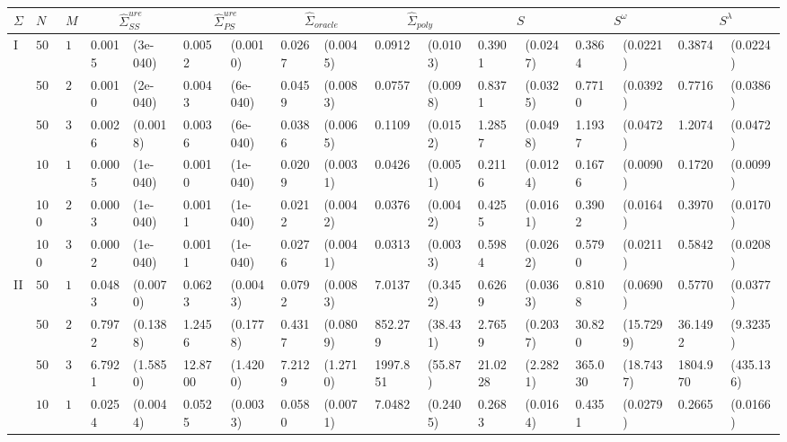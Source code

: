 \begin{landscape}
%
\begin{table}[H]
\centering
\begin{footnotesize}
\begin{tabular}{lllllllllllllllll}
$\Sigma$ & $N$ & $M$ & \multicolumn{2}{c}{$\hat{\Sigma}^{ure}_{SS}$} &  \multicolumn{2}{c}{$\hat{\Sigma}^{ure}_{PS}$} &  \multicolumn{2}{c}{$\hat{\Sigma}_{oracle}$}   &  \multicolumn{2}{c}{$\hat{\Sigma}_{poly}$}  &  \multicolumn{2}{c}{$S$}   &  \multicolumn{2}{c}{$S^\omega$}   &  \multicolumn{2}{c}{$S^\lambda$}   \\ 
  \hline
I & $50$ & $10$ & 0.0015 & (3e-040) & 0.0052 & (0.0010) & 0.0267 & (0.0045) & 0.0912 & (0.0103) & 0.3901 & (0.0247) & 0.3864 & (0.0221) & 0.3874 & (0.0224) \\ 
    &  50 & $20$ & 0.0010 & (2e-040) & 0.0043 & (6e-040) & 0.0459 & (0.0083) & 0.0757 & (0.0098) & 0.8371 & (0.0325) & 0.7710 & (0.0392) & 0.7716 & (0.0386) \\ 
    & 50  & $30$ & 0.0026 & (0.0018) & 0.0036 & (6e-040) & 0.0386 & (0.0065) & 0.1109 & (0.0152) & 1.2857 & (0.0498) & 1.1937 & (0.0472) & 1.2074 & (0.0472) \\ 
    & $100$ & $10$ & 0.0005 & (1e-040) & 0.0010 & (1e-040) & 0.0209 & (0.0031) & 0.0426 & (0.0051) & 0.2116 & (0.0124) & 0.1676 & (0.0090) & 0.1720 & (0.0099) \\ 
    &  100 & $20$ & 0.0003 & (1e-040) & 0.0011 & (1e-040) & 0.0212 & (0.0042) & 0.0376 & (0.0042) & 0.4255 & (0.0161) & 0.3902 & (0.0164) & 0.3970 & (0.0170) \\ 
    & 100  & $30$ & 0.0002 & (1e-040) & 0.0011 & (1e-040) & 0.0276 & (0.0041) & 0.0313 & (0.0033) & 0.5984 & (0.0262) & 0.5790 & (0.0211) & 0.5842 & (0.0208) \\ 
  II & $50$ & $10$ & 0.0483 & (0.0070) & 0.0623 & (0.0043) & 0.0792 & (0.0083) & 7.0137 & (0.3452) & 0.6269 & (0.0363) & 0.8108 & (0.0690) & 0.5770 & (0.0377) \\ 
    &50   & $20$ & 0.7972 & (0.1388) & 1.2456 & (0.1778) & 0.4317 & (0.0809) & 852.279 & (38.431) & 2.7659 & (0.2037) & 30.820 & (15.7299) & 36.1492 & (9.3235) \\ 
    &   50& $30$ & 6.7921 & (1.5850) & 12.8700 & (1.4200) & 7.2129 & (1.2710) & 1997.851 & (55.87) & 21.0228 & (2.2821) & 365.030 & (18.7437) & 1804.970 & (435.136) \\ 
    & $100$ & $10$ & 0.0254 & (0.0044) & 0.0525 & (0.0033) & 0.0580 & (0.0071) & 7.0482 & (0.2405) & 0.2683 & (0.0164) & 0.4351 & (0.0279) & 0.2665 & (0.0166) \\ 

\end{tabular}
\end{footnotesize}
\end{table}
\end{landscape}
